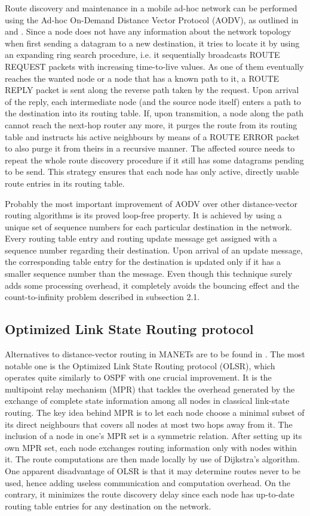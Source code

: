\documentclass{acm_proc_article-sp}
\begin{document}
Route discovery and maintenance in a mobile ad-hoc network can be performed using the Ad-hoc On-Demand Distance Vector Protocol (AODV), as outlined in \cite{haas} and \cite{perkins}. Since a node does not have any information about the network topology when first sending a datagram to a new destination, it tries to locate it by using an expanding ring search procedure, i.e. it sequentially broadcasts ROUTE REQUEST packets with increasing time-to-live values. As one of them eventually reaches the wanted node or a node that has a known path to it, a ROUTE REPLY packet is sent along the reverse path taken by the request. Upon arrival of the reply, each intermediate node (and the source node itself) enters a path to the destination into its routing table. If, upon transmition, a node along the path cannot reach the next-hop router any more, it purges the route from its routing table and instructs his active neighbours by means of a ROUTE ERROR packet to also purge it from theirs in a recursive manner. The affected source needs to repeat the whole route discovery procedure if it still has some datagrams pending to be send. This strategy ensures that each node has only active, directly usable route entries in its routing table.

Probably the most important improvement of AODV over other distance-vector routing algorithms is its proved loop-free property. It is achieved by using a unique set of sequence numbers for each particular destination in the network. Every routing table entry and routing update message get assigned with a sequence number regarding their destination. Upon arrival of an update message, the corresponding table entry for the destination is updated only if it has a smaller sequence number than the message. Even though this technique surely adds some processing overhead, it completely avoids the bouncing effect and the count-to-infinity problem described in subsection 2.1. 

\subsection{Optimized Link State Routing protocol}

Alternatives to distance-vector routing in MANETs are to be found in \cite{holter}. The most notable one is the Optimized Link State Routing protocol (OLSR), which operates quite similarly to OSPF with one crucial improvement. It is the multipoint relay mechanism (MPR) that tackles the overhead generated by the exchange of complete state information among all nodes in classical link-state routing. The key idea behind MPR is to let each node choose a minimal subset of its direct neighbours that covers all nodes at most two hops away from it. The inclusion of a node in one's MPR set is a symmetric relation. After setting up its own MPR set, each node exchanges routing information only with nodes within it. The route computations are then made locally by use of Dijkstra's algorithm. One apparent disadvantage of OLSR is that it may determine routes never to be used, hence adding useless communication and computation overhead. On the contrary, it minimizes the route discovery delay since each node has up-to-date routing table entries for any destination on the network. 
\end{document}
